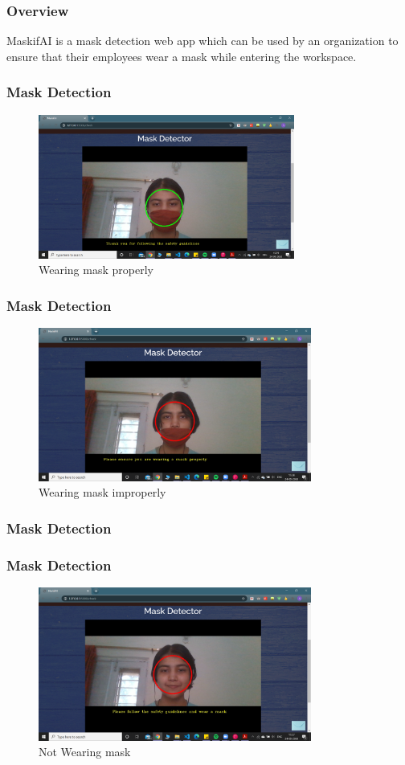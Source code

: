 \documentclass[14pt]{beamer}
\begin{document}
\begin{frame}
    \frametitle{Overview}
    MaskifAI is a mask detection web app which can be used by an organization to ensure that their employees wear a mask while entering the workspace.
\end{frame}



\begin{frame}
    \frametitle{Mask Detection}
    \begin{figure}
    \caption{Wearing mask properly}
    \centering
    \includegraphics[width=0.75\textwidth]{mask}
    \end{figure}
\end{frame}

\begin{frame}
    \frametitle{Mask Detection}
    \begin{figure}
    \caption{Wearing mask improperly}
    \centering
    \includegraphics[width=0.8\textwidth]{improper_mask__}
    \end{figure}
\end{frame}

\begin{frame}
    \frametitle{Mask Detection}
    \frametitle{Mask Detection}
    \begin{figure}
    \caption{Not Wearing mask}
    \centering
    \includegraphics[width=0.8\textwidth]{no_mask_}
    \end{figure}
\end{frame}
\end{document}
